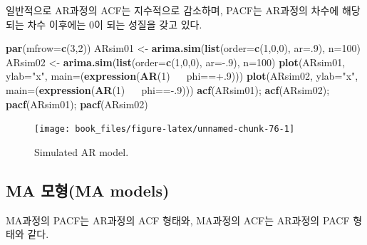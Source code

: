 \documentclass[b5paper,]{scrbook}
\makeatletter
\newenvironment{Shaded}{\begin{snugshade}}{\end{snugshade}}
\newcommand{\KeywordTok}[1]{\textcolor[rgb]{0.13,0.29,0.53}{\textbf{{#1}}}}
\newcommand{\DataTypeTok}[1]{\textcolor[rgb]{0.13,0.29,0.53}{{#1}}}
\newcommand{\DecValTok}[1]{\textcolor[rgb]{0.00,0.00,0.81}{{#1}}}
\newcommand{\StringTok}[1]{\textcolor[rgb]{0.31,0.60,0.02}{{#1}}}
\newcommand{\ErrorTok}[1]{\textcolor[rgb]{0.64,0.00,0.00}{\textbf{{#1}}}}
\newcommand{\NormalTok}[1]{{#1}}
\theoremstyle{plain}
\theoremstyle{definition}
\numberwithin{equation}{section}
\newenvironment{kframe}{%
\medskip{}
\setlength{\fboxsep}{.8em}
 \def\at@end@of@kframe{}%
 \ifinner\ifhmode%
  \def\at@end@of@kframe{\end{minipage}}%
  \begin{minipage}{\columnwidth}%
 \fi\fi%
 \def\FrameCommand##1{\hskip\@totalleftmargin \hskip-\fboxsep
 \colorbox{shadecolor}{##1}\hskip-\fboxsep
     \hskip-\linewidth \hskip-\@totalleftmargin \hskip\columnwidth}%
 \MakeFramed {\advance\hsize-\width
   \@totalleftmargin\z@ \linewidth\hsize
   \@setminipage}}%
 {\par\unskip\endMakeFramed%
 \at@end@of@kframe}
\renewenvironment{Shaded}{\begin{kframe}}{\end{kframe}}
\makeatother
\begin{document}
일반적으로 AR과정의 ACF는 지수적으로 감소하며, PACF는 AR과정의 차수에
해당되는 차수 이후에는 0이 되는 성질을 갖고 있다.

\begin{Shaded}
\begin{Highlighting}[]
\KeywordTok{par}\NormalTok{(}\DataTypeTok{mfrow=}\KeywordTok{c}\NormalTok{(}\DecValTok{3}\NormalTok{,}\DecValTok{2}\NormalTok{))}
\NormalTok{ARsim01 <-}\StringTok{ }\KeywordTok{arima.sim}\NormalTok{(}\KeywordTok{list}\NormalTok{(}\DataTypeTok{order=}\KeywordTok{c}\NormalTok{(}\DecValTok{1}\NormalTok{,}\DecValTok{0}\NormalTok{,}\DecValTok{0}\NormalTok{), }\DataTypeTok{ar=}\NormalTok{.}\DecValTok{9}\NormalTok{), }\DataTypeTok{n=}\DecValTok{100}\NormalTok{)}
\NormalTok{ARsim02 <-}\StringTok{ }\KeywordTok{arima.sim}\NormalTok{(}\KeywordTok{list}\NormalTok{(}\DataTypeTok{order=}\KeywordTok{c}\NormalTok{(}\DecValTok{1}\NormalTok{,}\DecValTok{0}\NormalTok{,}\DecValTok{0}\NormalTok{), }\DataTypeTok{ar=}\NormalTok{-.}\DecValTok{9}\NormalTok{), }\DataTypeTok{n=}\DecValTok{100}\NormalTok{)}
\KeywordTok{plot}\NormalTok{(ARsim01, }\DataTypeTok{ylab=}\StringTok{"x"}\NormalTok{, }\DataTypeTok{main=}\NormalTok{(}\KeywordTok{expression}\NormalTok{(}\KeywordTok{AR}\NormalTok{(}\DecValTok{1}\NormalTok{)~}\ErrorTok{~~}\NormalTok{phi==+.}\DecValTok{9}\NormalTok{)))}
\KeywordTok{plot}\NormalTok{(ARsim02, }\DataTypeTok{ylab=}\StringTok{"x"}\NormalTok{, }\DataTypeTok{main=}\NormalTok{(}\KeywordTok{expression}\NormalTok{(}\KeywordTok{AR}\NormalTok{(}\DecValTok{1}\NormalTok{)~}\ErrorTok{~~}\NormalTok{phi==-.}\DecValTok{9}\NormalTok{)))}
\KeywordTok{acf}\NormalTok{(ARsim01); }\KeywordTok{acf}\NormalTok{(ARsim02); }\KeywordTok{pacf}\NormalTok{(ARsim01); }\KeywordTok{pacf}\NormalTok{(ARsim02)}
\end{Highlighting}
\end{Shaded}

\begin{figure}

{\centering \texttt{[image: book\_files/figure-latex/unnamed-chunk-76-1]} 

}

\caption{Simulated AR model.}\label{fig:unnamed-chunk-76}
\end{figure}

\subsection{MA 모형(MA models)}\label{ma-ma-models}

MA과정의 PACF는 AR과정의 ACF 형태와, MA과정의 ACF는 AR과정의 PACF 형태와
같다.
\end{document}

